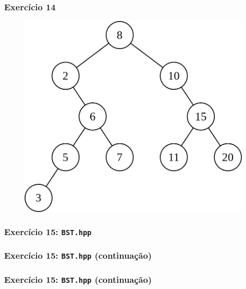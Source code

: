 \documentclass[aspectratio=169]{beamer}
\begin{document}
\begin{frame}[fragile]\frametitle{Exercício 14}
\begin{figure}[h]
	\centering
	\includegraphics[height=0.6\paperheight]{imagens/abp03.png}
\end{figure}
\end{frame}

\begin{frame}[fragile]\frametitle{Exercício 15: \texttt{BST.hpp}}
\fontsize{3pt}{5pt}\selectfont{

}
\end{frame}

\begin{frame}[fragile]\frametitle{Exercício 15: \texttt{BST.hpp} (continuação)}
\fontsize{3pt}{5pt}\selectfont{

}
\end{frame}

\begin{frame}[fragile]\frametitle{Exercício 15: \texttt{BST.hpp} (continuação)}
\fontsize{3pt}{5pt}\selectfont{

}
\end{frame}
\end{document}
